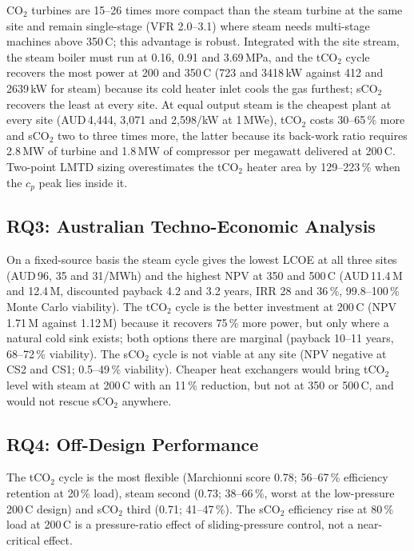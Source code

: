 CO$_2$ turbines are 15--26 times more compact than the steam turbine at the
same site and remain single-stage (VFR 2.0--3.1) where steam needs
multi-stage machines above 350\,\textdegree C; this advantage is robust.
Integrated with the site stream, the steam boiler must run at 0.16, 0.91 and
3.69\,MPa, and the tCO$_2$ cycle recovers the most power at 200 and
350\,\textdegree C (723 and 3418\,kW against 412 and 2639\,kW for steam)
because its cold heater inlet cools the gas furthest; sCO$_2$ recovers the
least at every site. At equal output steam is the cheapest plant at every
site (AUD\,4{,}444, 3{,}071 and 2{,}598/kW at 1\,MWe), tCO$_2$ costs 30--65\,\%
more and sCO$_2$ two to three times more, the latter because its back-work
ratio requires 2.8\,MW of turbine and 1.8\,MW of compressor per megawatt
delivered at 200\,\textdegree C. Two-point LMTD sizing overestimates the
tCO$_2$ heater area by 129--223\,\% when the $c_p$ peak lies inside it.

\subsection{RQ3: Australian Techno-Economic Analysis}

On a fixed-source basis the steam cycle gives the lowest LCOE at all three
sites (AUD\,96, 35 and 31/MWh) and the highest NPV at 350 and
500\,\textdegree C (AUD\,11.4\,M and 12.4\,M, discounted payback 4.2 and
3.2 years, IRR 28 and 36\,\%, 99.8--100\,\% Monte Carlo viability). The
tCO$_2$ cycle is the better investment at 200\,\textdegree C (NPV 1.71\,M
against 1.12\,M) because it recovers 75\,\% more power, but only where a
natural cold sink exists; both options there are marginal (payback 10--11
years, 68--72\,\% viability). The sCO$_2$ cycle is not viable at any site
(NPV negative at CS2 and CS1; 0.5--49\,\% viability). Cheaper heat exchangers
would bring tCO$_2$ level with steam at 200\,\textdegree C with an 11\,\%
reduction, but not at 350 or 500\,\textdegree C, and would not rescue sCO$_2$
anywhere.

\subsection{RQ4: Off-Design Performance}

The tCO$_2$ cycle is the most flexible (Marchionni score 0.78; 56--67\,\%
efficiency retention at 20\,\% load), steam second (0.73; 38--66\,\%, worst
at the low-pressure 200\,\textdegree C design) and sCO$_2$ third (0.71;
41--47\,\%). The sCO$_2$ efficiency rise at 80\,\% load at 200\,\textdegree C
is a pressure-ratio effect of sliding-pressure control, not a near-critical
effect.

